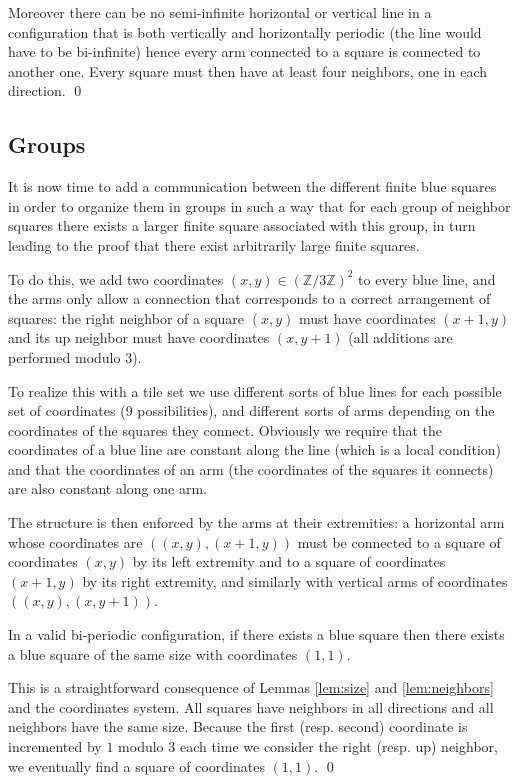 \documentclass{jac}
\newcommand{\ZZ}{\mathbb{Z}}
\begin{document}
Moreover there can be no semi-infinite horizontal or vertical line in a configuration that is both vertically and horizontally periodic (the line would have to be bi-infinite) hence every arm connected to a square is connected to another one. Every square must then have at least four neighbors, one in each direction.
\qed

\subsection{Groups} \label{sub:groups}
It is now time to add a communication between the different finite blue squares in order to organize them in groups in such a way that for each group of neighbor squares there exists a larger finite square associated with this group, in turn leading to the proof that there exist arbitrarily large finite squares.

To do this, we add two coordinates $(x, y)\in (\ZZ/3\ZZ)^2$ to every blue line, and the arms only allow a connection that corresponds to a correct arrangement of squares: the right neighbor of a square $(x, y)$ must have coordinates $(x +1, y)$ and its up neighbor must have coordinates $(x, y+1)$ (all additions are performed modulo $3$).

To realize this with a tile set we use different sorts of blue lines for each possible set of coordinates (9 possibilities), and different sorts of arms depending on the coordinates of the squares they connect. Obviously we require that the coordinates of a blue line are constant along the line (which is a local condition) and that the coordinates of an arm (the coordinates of the squares it connects) are also constant along one arm.

The structure is then enforced by the arms at their extremities: a horizontal arm whose coordinates are $((x, y), (x+1, y))$ must be connected to a square of coordinates $(x,y)$ by its left extremity and to a square of coordinates $(x+1, y)$ by its right extremity, and similarly with vertical arms of coordinates $((x, y), (x, y+1))$.

\begin{lemma}\label{lem:oneone}
In a valid bi-periodic configuration, if there exists a blue square then there exists a blue square of the same size with coordinates $(1, 1)$.
\end{lemma}
\proof This is a straightforward consequence of Lemmas \ref{lem:size} and \ref{lem:neighbors} and the coordinates system. All squares have neighbors in all directions and all neighbors have the same size. Because the first (resp. second) coordinate is incremented by $1$ modulo $3$ each time we consider the right (resp. up) neighbor, we eventually find a square of coordinates $(1, 1)$.
\qed
\end{document}
